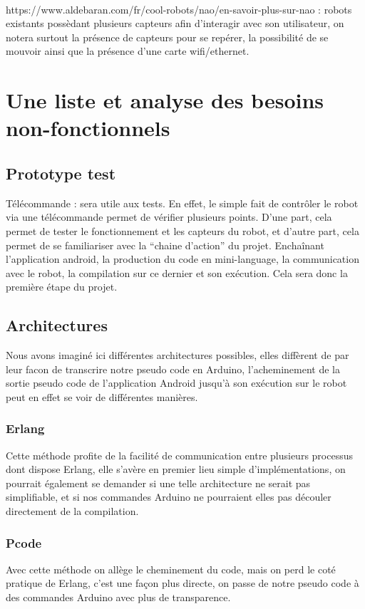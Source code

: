 \documentclass[a4paper]{article}
\begin{document}
\paragraph{}
https://www.aldebaran.com/fr/cool-robots/nao/en-savoir-plus-sur-nao : robots existants possèdant plusieurs capteurs afin d’interagir avec son utilisateur, on notera surtout la présence de capteurs pour se repérer, la possibilité de se mouvoir ainsi que la présence d’une carte wifi/ethernet.

\section{Une liste et analyse des besoins non-fonctionnels}
\subsection{Prototype test}
Télécommande : sera utile aux tests. En effet, le simple fait de contrôler le robot via une télécommande permet de vérifier plusieurs points. D’une part, cela permet de tester le fonctionnement et les capteurs du robot, et d’autre part, cela permet de se familiariser avec la “chaine d’action” du projet. Enchaînant l’application android, la production du code en mini-language, la communication avec le robot, la compilation sur ce dernier et son exécution. Cela sera donc la première étape du projet.

\subsection{Architectures}
Nous avons imaginé ici différentes architectures possibles, elles diffèrent de par leur facon de transcrire notre pseudo code en Arduino, l’acheminement de la sortie pseudo code de l’application Android jusqu'à son exécution sur le robot peut en effet se voir de différentes manières.
\subsubsection{Erlang}
Cette méthode profite de la facilité de communication entre plusieurs processus dont dispose Erlang, elle s’avère en premier lieu simple d’implémentations, on pourrait également se demander si une telle architecture ne serait pas simplifiable, et si nos commandes Arduino ne pourraient elles pas découler directement de la compilation.

\subsubsection{Pcode}
Avec cette méthode on allège le cheminement du code, mais on perd le coté pratique de Erlang, c’est une façon plus directe, on passe de notre pseudo code à des commandes Arduino avec plus de transparence.
\end{document}
